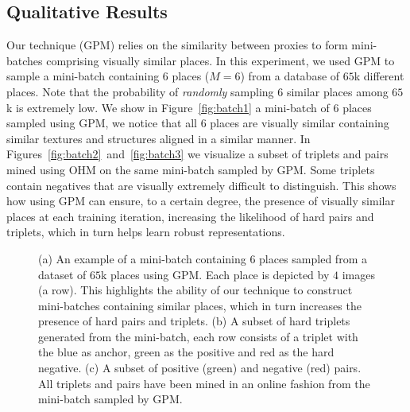 \documentclass{bmvc2k}
\begin{document}
\subsection{Qualitative Results}\label{ssec:qualitative}
Our technique (GPM) relies on the similarity between proxies to form mini-batches comprising visually similar places. In this experiment, we used GPM to sample a mini-batch containing $6$ places ($M=6$) from a database of $65$k different places. Note that the probability of \emph{randomly} sampling $6$ similar places among $65$k is extremely low. We show in Figure~\ref{fig:batch1} a mini-batch of $6$ places sampled using GPM, we notice that all $6$ places are visually similar containing similar textures and structures aligned in a similar manner. In Figures~\ref{fig:batch2}~and~\ref{fig:batch3} we visualize a subset of triplets and pairs mined using OHM on the same mini-batch sampled by GPM. Some triplets contain negatives that are visually extremely difficult to distinguish. This shows how using GPM can ensure, to a certain degree, the presence of visually similar places at each training iteration, increasing the likelihood of hard pairs and triplets, which in turn helps learn robust representations.
\begin{figure}[thb]\centering
{}
\hfill
{}
\hfill
{}
\vspace{3pt}
\caption{\small (a) An example of a mini-batch containing $6$ places sampled from a dataset of $65$k places using GPM. Each place is depicted by $4$ images (a row). This highlights the ability of our technique to construct mini-batches containing similar places, which in turn increases the presence of hard pairs and triplets. (b) A subset of hard triplets generated from the mini-batch, each row consists of a triplet with the blue as anchor, green as the positive and red as the hard negative. (c) A subset of positive (green) and negative (red) pairs. All triplets and pairs have been mined in an online fashion from the mini-batch sampled by GPM.}
\label{fig:a_batch}
\end{figure}
\end{document}
